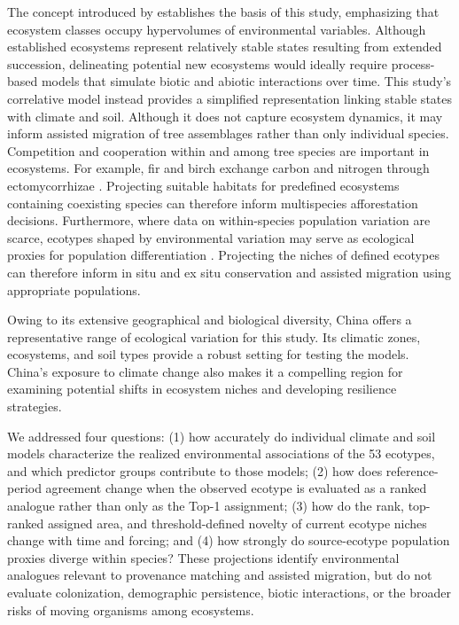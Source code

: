\documentclass[11pt]{article}
\begin{document}
The concept introduced by \citet{hutchinson1957} establishes the basis of this study, emphasizing that ecosystem classes occupy hypervolumes of environmental variables. Although established ecosystems represent relatively stable states resulting from extended succession, delineating potential new ecosystems would ideally require process-based models that simulate biotic and abiotic interactions over time. This study's correlative model instead provides a simplified representation linking stable states with climate and soil. Although it does not capture ecosystem dynamics, it may inform assisted migration of tree assemblages rather than only individual species. Competition and cooperation within and among tree species are important in ecosystems. For example, fir and birch exchange carbon and nitrogen through ectomycorrhizae \citep{simard1997}. Projecting suitable habitats for predefined ecosystems containing coexisting species can therefore inform multispecies afforestation decisions. Furthermore, where data on within-species population variation are scarce, ecotypes shaped by environmental variation may serve as ecological proxies for population differentiation \citep{wang2020,wangCampbell2026}. Projecting the niches of defined ecotypes can therefore inform in situ \citep{hamann2005} and ex situ \citep{wang2020} conservation and assisted migration using appropriate populations.

Owing to its extensive geographical and biological diversity, China offers a representative range of ecological variation for this study. Its climatic zones, ecosystems, and soil types provide a robust setting for testing the models. China's exposure to climate change also makes it a compelling region for examining potential shifts in ecosystem niches and developing resilience strategies.

We addressed four questions: (1) how accurately do individual climate and soil
models characterize the realized environmental associations of the 53
ecotypes, and which predictor groups contribute to those models; (2) how does
reference-period agreement change when the observed ecotype is evaluated as a
ranked analogue rather than only as the Top-1 assignment; (3) how do the rank,
top-ranked assigned area, and threshold-defined novelty of current ecotype
niches change with time and forcing; and (4) how strongly do source-ecotype
population proxies diverge within species? These projections identify
environmental analogues relevant to provenance matching and assisted
migration, but do not evaluate colonization, demographic persistence, biotic
interactions, or the broader risks of moving organisms among ecosystems.
\end{document}
